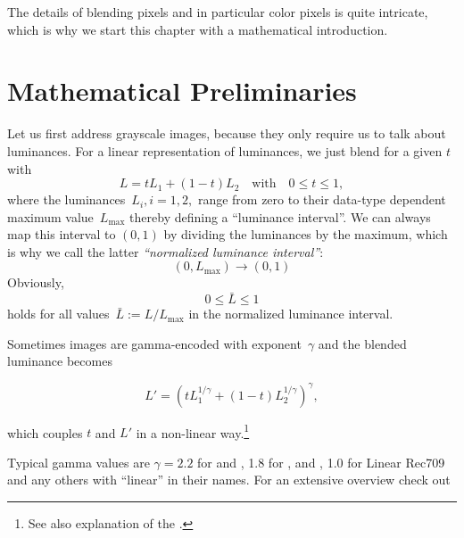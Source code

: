 The details of blending pixels and in particular color pixels is quite
intricate, which is why we start this chapter with a mathematical
introduction.


\section[Mathematical Preliminaries]{Mathematical Preliminaries
  \label{sec:mathematical-preliminaries}
  }

Let us first address grayscale images, because they only require us to
talk about luminances.  For a linear representation of luminances, we
just blend for a given $t$ with
\begin{equation}\label{equ:trivial-luminance-blend}
  L = t L_1 + (1 - t) L_2 \quad \mbox{with} \quad 0 \leq t \leq 1,
\end{equation}
where the luminances~$L_i, i = 1, 2,$ range from zero to their
data-type dependent maximum value~$L_{\mathrm{max}}$ thereby defining
a ``luminance interval''. We can always map
this interval to $(0, 1)$ by dividing the luminances by the maximum,
which is why we call the latter \emph{``normalized luminance
  interval''}:
\begin{equation}\label{equ:luminance-normalization}
  (0, L_{\mathrm{max}}) \rightarrow (0, 1)
\end{equation}
Obviously,
\begin{equation}\label{equ:normalized-luminance}
  0 \leq \bar{L} \leq 1
\end{equation}
holds for all values~$\bar{L} := L / L_{\mathrm{max}}$ in the
normalized luminance interval.

Sometimes images are gamma-encoded with exponent~$\gamma$ and the blended
luminance becomes

\begin{equation}\label{equ:gamma-luminance-blend}
L' = \left(t L_1^{1/\gamma} + (1 - t) L_2^{1/\gamma}\right)^\gamma,
\end{equation}

which couples $t$ and $L'$ in a non-linear way.\footnote{See also
   explanation of the
  .}

\begin{geeknote}
  Typical gamma values are $\gamma = 2.2$ for  and
  , 1.8 for , and
  , 1.0 for Linear Rec709  and any
  others with ``linear'' in their names.  For an extensive overview
  check out 
\end{geeknote}

